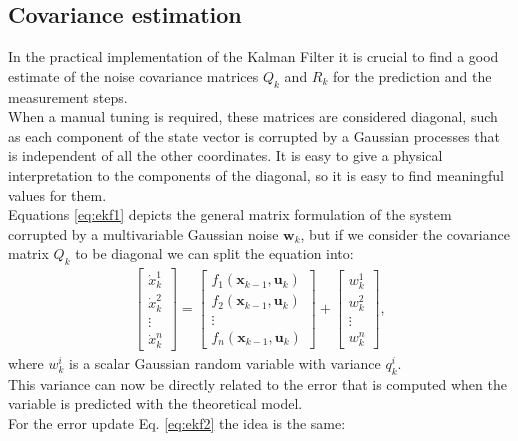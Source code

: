 \newpage
\subsection{Covariance estimation}
In the practical implementation of the Kalman Filter it is crucial to find a good estimate of the noise covariance matrices $Q_k$ and $R_k$ for the prediction and the measurement steps. \\
When a manual tuning is required, these matrices are considered diagonal, such as each component of the state vector is corrupted by a Gaussian processes that is independent of all the other coordinates. It is easy to give a physical interpretation to the components of the diagonal, so it is easy to find meaningful values for them.\\
Equations \eqref{eq:ekf1} depicts the general matrix formulation of the system corrupted by a multivariable Gaussian noise $\boldsymbol{w}_k$, but if we consider the covariance matrix $Q_k$ to be diagonal we can split the equation into:
\begin{align}
{\begin{bmatrix}
\dot{x}_k^1 \\[10pt]
\dot{x}_k^2 \\[10pt]
\vdots \\[10pt]
\dot{x}_k^n
\end{bmatrix}}=
{\begin{bmatrix}
 f_1(\boldsymbol{x}_{k-1},\boldsymbol{u}_k) \\[10pt]
f_2(\boldsymbol{x}_{k-1},\boldsymbol{u}_k)  \\[10pt]
\vdots \\[10pt]
f_n(\boldsymbol{x}_{k-1},\boldsymbol{u}_k) 
\end{bmatrix}} 
+ 
{\begin{bmatrix}
w_k^1 \\[10pt]
w_k^2 \\[10pt]
\vdots \\[10pt]
w_k^n
\end{bmatrix}},
\end{align}
where $w_k^i$ is a scalar Gaussian random variable with variance $q_k^i$.\\
This variance can now be directly related to the error that is computed when the variable is predicted with the theoretical model.\\
For the error update Eq. \eqref{eq:ekf2} the idea is the same: 
